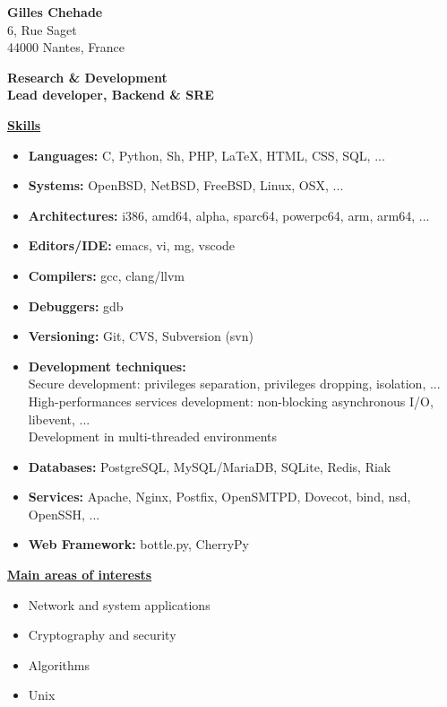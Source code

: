 \documentclass[a4paper,10pt]{letter}
\begin{document}
\textbf{Gilles Chehade}\\
6, Rue Saget\\
44000 Nantes, France\\

\begin{center}
  \large
  \textbf {
    Research \& Development\\
    Lead developer, Backend \& SRE\\
  }
\end{center}

\normalsize

\underline{\textbf{Skills}}\\
\begin{itemize}
\item	\textbf{Languages:}
  C, Python, Sh, PHP, \LaTeX, HTML, CSS, SQL, ...
\item	\textbf{Systems:}
  OpenBSD, NetBSD, FreeBSD, Linux, OSX, ...
\item	\textbf{Architectures:}
  i386, amd64, alpha, sparc64, powerpc64, arm, arm64, ...
\item	\textbf{Editors/IDE:}
  emacs, vi, mg, vscode
\item	\textbf{Compilers:}
  gcc, clang/llvm
\item	\textbf{Debuggers:}
  gdb
\item	\textbf{Versioning:}
  Git, CVS, Subversion (svn)
\item	\textbf{Development techniques:}\\
  Secure development:
  privileges separation, privileges dropping, isolation, ...\\
  High-performances services development:
  non-blocking asynchronous I/O, libevent, ...\\
  Development in multi-threaded environments

\item	\textbf{Databases:}
  PostgreSQL, MySQL/MariaDB, SQLite, Redis, Riak
\item	\textbf{Services:}
  Apache, Nginx, Postfix, OpenSMTPD, Dovecot, bind, nsd, OpenSSH, ...
\item	\textbf{Web Framework:}
  bottle.py, CherryPy\\
\end{itemize}

\underline{\textbf{Main areas of interests}}\\
\begin{itemize}
\item Network and system applications
\item Cryptography and security
\item Algorithms
\item Unix\\
\end{itemize}
\end{document}
